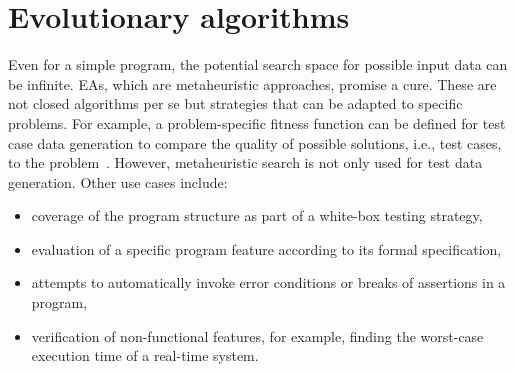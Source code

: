 \documentclass[paper=a4,%
  twoside,%
  BCOR4mm,%
  abstract=true,%
  toc=bibliography,%
  chapterprefix=true,%
  toc=bibliographynumbered,%
  open=right,%
  english,%
  pagesize=pdftex]{scrreprt}
\newcommand{\todo}[1]{\textbf{TODO: #1}}
\begin{document}
\section{Evolutionary algorithms}
Even for a simple program, the potential search space for possible input data can be infinite. \acp{EA}, which are metaheuristic approaches, promise a cure. These are not closed algorithms per se but strategies that can be adapted to specific problems. For example, a problem-specific fitness function can be defined for test case data generation to compare the quality of possible solutions, i.e., test cases, to the problem~\cite{McMinn_2004}. However, metaheuristic search is not only used for test data generation. Other use cases include:
\begin{itemize}
	\item coverage of the program structure as part of a white-box testing strategy,
	\item evaluation of a specific program feature according to its formal specification,
	\item attempts to automatically invoke error conditions or breaks of assertions in a program,
	\item verification of non-functional features, for example, finding the worst-case execution time of a real-time system.
\end{itemize}

\end{document}
